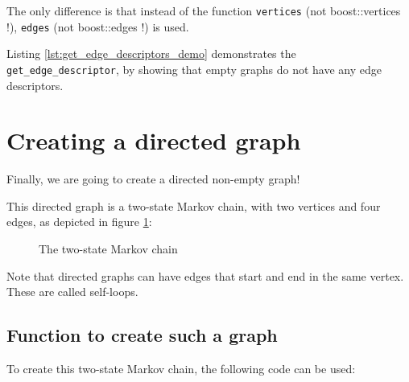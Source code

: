 The only difference is that instead of the 
function \verb;vertices; 
(not boost::vertices !), 
\verb;edges;  
(not boost::edges !) is used.

Listing \ref{lst:get_edge_descriptors_demo}
demonstrates the \verb;get_edge_descriptor;, by showing that empty graphs do
not have any edge descriptors.



\section{Creating a directed graph}
\label{subsec:create_markov_chain_graph}

Finally, we are going to create a directed non-empty graph! 

This directed graph is a two-state Markov chain, with two vertices and four
edges, as depicted in figure \ref{fig:markov_chain}:

\begin{figure}
  \caption{The two-state Markov chain}
  \label{fig:markov_chain}
\end{figure}

Note that directed graphs can have edges that start and end in the same
vertex.
These are called self-loops.

\subsection{Function to create such a graph}

To create this two-state Markov chain, the following code can be used:

